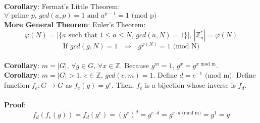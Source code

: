 \documentclass{scribe}
\begin{document}
\noindent\textbf{Corollary}: Fermat's Little Theorem: $\forall \text{ prime } p \text{, } gcd(a,p)=1 \text{ and } a^{p-1} = 1 \text{ (mod p)}$
\vspace{3mm}
\\\noindent\textbf{More General Theorem}: Euler's Theorem:
\[\varphi(N) = |\{a \text{ such that } 1 \le a \le N \text{,  } gcd(a,N) =1\}| \text{,  } |\mathbb{Z}_n^{*}| = \varphi(N)\]
\[\text{If } gcd(g,N) = 1 \text{  }\Rightarrow\text{  } g^{\varphi(N)} = 1 \text{ (mod N)}\]
\vspace{3mm}
\\\noindent\textbf{Corollary}: $m=|G|$, $\forall g \in G$, $\forall x \in \mathbb{Z}$. Because $g^m = 1$, $g^x = g^{x \text{ mod m}}$.
\vspace{3mm}
\\\noindent\textbf{Corollary}: $m = |G| > 1$, $e \in \mathbb{Z}$, $gcd(e,m) =1$. Define $d=e^{-1} \text{ (mod m)}$. Define function $f_e:G \rightarrow G$ as $f_e(g) = g^e$. Then, $f_e$ is a bijection whose inverse is $f_d$.
\\\\\noindent\textbf{Proof}:
\[f_d(f_e(g)) = f_d(g^e) = (g^e)^d = g^{e \cdot d} = g ^{e \cdot d \text{ (mod m)}} = g^{1} = g\]
\vspace{8mm}
\end{document}
